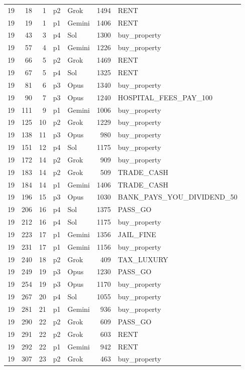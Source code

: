 \begin{longtable}{r r r l l r >{\ttfamily}l}
19 & 18 & 1 & p2 & Grok & 1494 & RENT \\
19 & 19 & 1 & p1 & Gemini & 1406 & RENT \\
19 & 43 & 3 & p4 & Sol & 1300 & buy\_property \\
19 & 57 & 4 & p1 & Gemini & 1226 & buy\_property \\
19 & 66 & 5 & p2 & Grok & 1469 & RENT \\
19 & 67 & 5 & p4 & Sol & 1325 & RENT \\
19 & 81 & 6 & p3 & Opus & 1340 & buy\_property \\
19 & 90 & 7 & p3 & Opus & 1240 & HOSPITAL\_FEES\_PAY\_100 \\
19 & 111 & 9 & p1 & Gemini & 1006 & buy\_property \\
19 & 125 & 10 & p2 & Grok & 1229 & buy\_property \\
19 & 138 & 11 & p3 & Opus & 980 & buy\_property \\
19 & 151 & 12 & p4 & Sol & 1175 & buy\_property \\
19 & 172 & 14 & p2 & Grok & 909 & buy\_property \\
19 & 183 & 14 & p2 & Grok & 509 & TRADE\_CASH \\
19 & 184 & 14 & p1 & Gemini & 1406 & TRADE\_CASH \\
19 & 196 & 15 & p3 & Opus & 1030 & BANK\_PAYS\_YOU\_DIVIDEND\_50 \\
19 & 206 & 16 & p4 & Sol & 1375 & PASS\_GO \\
19 & 212 & 16 & p4 & Sol & 1175 & buy\_property \\
19 & 223 & 17 & p1 & Gemini & 1356 & JAIL\_FINE \\
19 & 231 & 17 & p1 & Gemini & 1156 & buy\_property \\
19 & 240 & 18 & p2 & Grok & 409 & TAX\_LUXURY \\
19 & 249 & 19 & p3 & Opus & 1230 & PASS\_GO \\
19 & 254 & 19 & p3 & Opus & 1170 & buy\_property \\
19 & 267 & 20 & p4 & Sol & 1055 & buy\_property \\
19 & 281 & 21 & p1 & Gemini & 936 & buy\_property \\
19 & 290 & 22 & p2 & Grok & 609 & PASS\_GO \\
19 & 291 & 22 & p2 & Grok & 603 & RENT \\
19 & 292 & 22 & p1 & Gemini & 942 & RENT \\
19 & 307 & 23 & p2 & Grok & 463 & buy\_property \\

\end{longtable}
